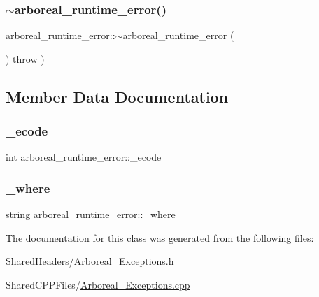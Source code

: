 \subsubsection{\texorpdfstring{$\sim$arboreal\+\_\+runtime\+\_\+error()}{~arboreal\_runtime\_error()}}
{\footnotesize\ttfamily arboreal\+\_\+runtime\+\_\+error\+::$\sim$arboreal\+\_\+runtime\+\_\+error (\begin{DoxyParamCaption}{ }\end{DoxyParamCaption}) throw  ) }



\subsection{Member Data Documentation}
\mbox{\label{classarboreal__runtime__error_a08953e7ed35ac7db0d86032a3eb3f837}} 
\subsubsection{\texorpdfstring{\+\_\+ecode}{\_ecode}}
{\footnotesize\ttfamily int arboreal\+\_\+runtime\+\_\+error\+::\+\_\+ecode\hspace{0.3cm}{\ttfamily [protected]}}

\mbox{\label{classarboreal__runtime__error_afca0adf6a259600843b6975591e0bde4}} 
\subsubsection{\texorpdfstring{\+\_\+where}{\_where}}
{\footnotesize\ttfamily string arboreal\+\_\+runtime\+\_\+error\+::\+\_\+where\hspace{0.3cm}{\ttfamily [protected]}}



The documentation for this class was generated from the following files\+:\begin{DoxyCompactItemize}
\item 
Shared\+Headers/\mbox{\hyperlink{_arboreal___exceptions_8h}{Arboreal\+\_\+\+Exceptions.\+h}}\item 
Shared\+C\+P\+P\+Files/\mbox{\hyperlink{_arboreal___exceptions_8cpp}{Arboreal\+\_\+\+Exceptions.\+cpp}}\end{DoxyCompactItemize}
